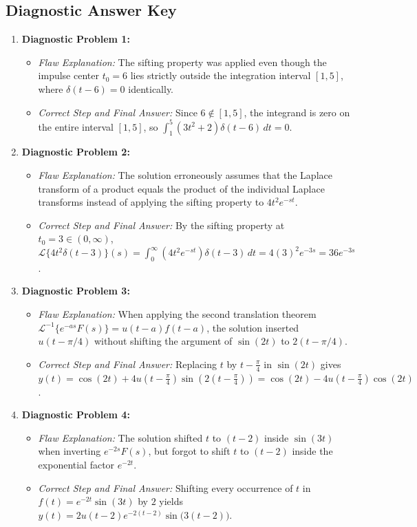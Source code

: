 \documentclass[11pt, letterpaper]{article}
\theoremstyle{definition}
\theoremstyle{remark}
\begin{document}
\subsection{Diagnostic Answer Key}
\begin{enumerate}
    \item \textbf{Diagnostic Problem 1:}
    \begin{itemize}
        \item \emph{Flaw Explanation:} The sifting property was applied even though the impulse center $t_0 = 6$ lies strictly outside the integration interval $[1, 5]$, where $\delta(t - 6) = 0$ identically.
        \item \emph{Correct Step and Final Answer:} Since $6 \notin [1, 5]$, the integrand is zero on the entire interval $[1, 5]$, so $\int_{1}^{5} (3t^2 + 2)\delta(t - 6)\,dt = 0$.
    \end{itemize}

    \item \textbf{Diagnostic Problem 2:}
    \begin{itemize}
        \item \emph{Flaw Explanation:} The solution erroneously assumes that the Laplace transform of a product equals the product of the individual Laplace transforms instead of applying the sifting property to $4t^2 e^{-st}$.
        \item \emph{Correct Step and Final Answer:} By the sifting property at $t_0 = 3 \in (0, \infty)$, $\mathcal{L}\{4t^2 \delta(t - 3)\}(s) = \int_0^\infty (4t^2 e^{-st})\delta(t - 3)\,dt = 4(3)^2 e^{-3s} = 36e^{-3s}$.
    \end{itemize}

    \item \textbf{Diagnostic Problem 3:}
    \begin{itemize}
        \item \emph{Flaw Explanation:} When applying the second translation theorem $\mathcal{L}^{-1}\{e^{-as}F(s)\} = u(t - a)f(t - a)$, the solution inserted $u(t - \pi/4)$ without shifting the argument of $\sin(2t)$ to $2(t - \pi/4)$.
        \item \emph{Correct Step and Final Answer:} Replacing $t$ by $t - \frac{\pi}{4}$ in $\sin(2t)$ gives $y(t) = \cos(2t) + 4u\left(t - \frac{\pi}{4}\right)\sin\left(2\left(t - \frac{\pi}{4}\right)\right) = \cos(2t) - 4u\left(t - \frac{\pi}{4}\right)\cos(2t)$.
    \end{itemize}

    \item \textbf{Diagnostic Problem 4:}
    \begin{itemize}
        \item \emph{Flaw Explanation:} The solution shifted $t$ to $(t - 2)$ inside $\sin(3t)$ when inverting $e^{-2s}F(s)$, but forgot to shift $t$ to $(t - 2)$ inside the exponential factor $e^{-2t}$.
        \item \emph{Correct Step and Final Answer:} Shifting every occurrence of $t$ in $f(t) = e^{-2t}\sin(3t)$ by $2$ yields $y(t) = 2u(t - 2)e^{-2(t - 2)}\sin\bigl(3(t - 2)\bigr)$.
    \end{itemize}


\end{enumerate}
\end{document}
